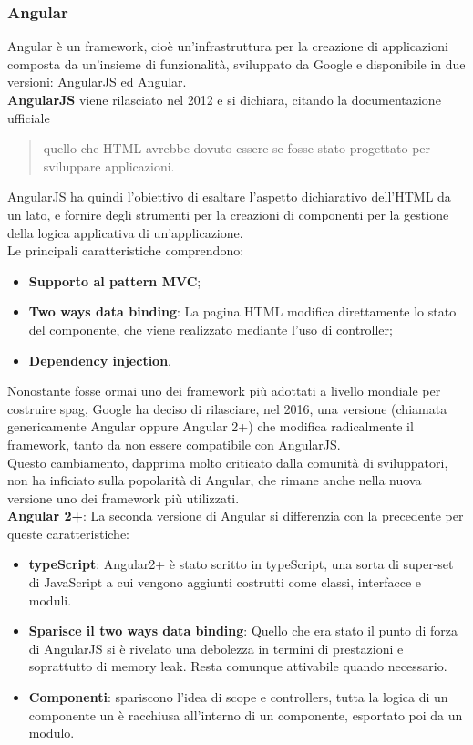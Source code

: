 \subsubsection{Angular}
Angular è un framework, cioè un'infrastruttura per la creazione di applicazioni composta da un'insieme di funzionalità, sviluppato da Google e disponibile in due versioni: AngularJS ed Angular.\\
\textbf{AngularJS} viene rilasciato nel 2012 e si dichiara, citando la documentazione ufficiale 
\begin{quote}
quello che HTML avrebbe dovuto essere se fosse stato progettato per sviluppare applicazioni.
\end{quote}  %
AngularJS ha quindi l'obiettivo di esaltare l'aspetto dichiarativo dell'HTML da un lato, e fornire degli strumenti per la creazioni di componenti per la gestione della logica applicativa di un'applicazione.\\
Le principali caratteristiche comprendono:
\begin{itemize}
	\item \textbf{Supporto al pattern MVC};
	\item \textbf{Two ways data binding}: La pagina HTML modifica direttamente lo stato del componente, che viene realizzato mediante l'uso di controller;
	\item \textbf{Dependency injection}. %
\end{itemize}
Nonostante fosse ormai uno dei framework più adottati a livello mondiale per costruire \gls{spag}, Google ha deciso di rilasciare, nel 2016, una versione (chiamata genericamente Angular oppure Angular 2+) che modifica radicalmente il framework, tanto da non essere compatibile con AngularJS.\\
Questo cambiamento, dapprima molto criticato dalla comunità di sviluppatori, non ha inficiato sulla popolarità di Angular, che rimane anche nella nuova versione uno dei framework più utilizzati.\\
\textbf{Angular 2+}: La seconda versione di Angular si differenzia con la precedente per queste caratteristiche:
\begin{itemize}
	\item \textbf{typeScript}: Angular2+ è stato scritto in typeScript, una sorta di super-set di JavaScript a cui vengono aggiunti costrutti come classi, interfacce e moduli.
	\item \textbf{Sparisce il two ways data binding}: Quello che era stato il punto di forza di AngularJS si è rivelato una debolezza in termini di prestazioni e soprattutto di memory leak. Resta comunque attivabile quando necessario.
	\item \textbf{Componenti}: spariscono l'idea di scope e controllers, tutta la logica di un componente un è racchiusa all'interno di un componente, esportato poi da un modulo. %
\end{itemize}
